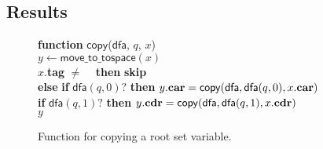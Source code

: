 \documentclass[9pt]{sigplanconf}
\begin{document}
\begin{enumerate}
\subsection{Results}
\begin{figure}[t] 
\centering
\begin{boxedminipage}{.75\textwidth}
{\bf function} $\mathsf{copy}$($\mathsf{dfa}$, $q$, $x$)\\ 
\noindent \hspace*{.35cm}$y \leftarrow \mathsf{move\_to\_tospace}(x)$\\
\noindent \hspace*{.35cm}{\bf if} $x$.{\bf tag} $\neq$ \CONS\ {\bf
  then} {\bf skip}\\ 
\noindent \hspace*{.25cm}  {\bf else} {\bf if}  $\mathsf{dfa}(q,0)\mathsf{?}$ {\bf then}   $y.\mbox{$\mathbf{car}$} = \mathsf{copy}(\mathsf{dfa}, \mathsf{dfa}(q,0),x.\mbox{$\mathbf{car}$})$\\ 
\noindent \hspace*{0.95cm} {\bf if}  $\mathsf{dfa}(q, 1)\mathsf{?}$ {\bf then}  $y.\mbox{$\mathbf{cdr}$} = \mathsf{copy}(\mathsf{dfa}, \mathsf{dfa}(q,1),x.\mbox{$\mathbf{cdr}$})$\\
\noindent \hspace*{.35cm}{\bf return} $y$
\end{boxedminipage}
\caption{Function       for       copying       a       root       set
  variable.}\label{algo:LGC-main-loop} \figrule

\end{figure}




\end{enumerate}
\end{document}
